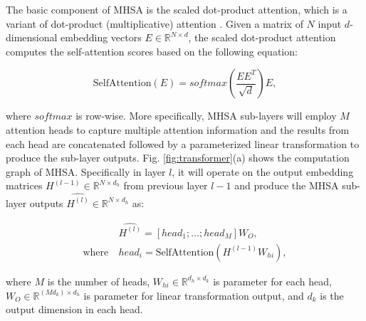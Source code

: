 The basic component of MHSA is the scaled dot-product attention, which is a variant of dot-product (multiplicative) attention \cite{luong2015effective}.
Given a matrix of $N$ input $d$-dimensional embedding vectors $E\in \mathbb{R}^{N\times d}$,
the scaled dot-product attention computes the self-attention scores based on the following equation:
\begin{small}
\begin{equation}
\text{SelfAttention}(E)=softmax(\frac{EE^T}{\sqrt{d}})E,
\end{equation}
\end{small}
where $softmax$ is row-wise. 
More specifically,
MHSA sub-layers will employ $M$ attention heads to capture multiple attention information
and the results from each head are concatenated followed by a parameterized linear transformation to produce the sub-layer outputs.
Fig. \ref{fig:transformer}(a) shows the computation graph of MHSA.
Specifically in layer $l$, it will operate on the output embedding matrices
$H^{(l-1)}\in \mathbb{R}^{N\times d_h}$ from previous layer $l-1$
and produce the MHSA sub-layer outputs $\widehat{H^{(l)}}\in \mathbb{R}^{N\times d_h}$ as:
\begin{small}
\begin{equation}
\begin{aligned}
&\widehat{H^{(l)}}=[head_1;\dots;head_M]W_O, \\
\text{where}\ &head_i=\text{SelfAttention}(H^{(l-1)}W_{hi}),
\end{aligned}
\end{equation}
\end{small}
where $M$ is the number of heads,
$W_{hi}\in \mathbb{R}^{d_h\times d_k}$ is parameter for each head,
$W_O\in \mathbb{R}^{(Md_k)\times d_h}$ is parameter for linear transformation output,
and $d_k$ is the output dimension in each head.

